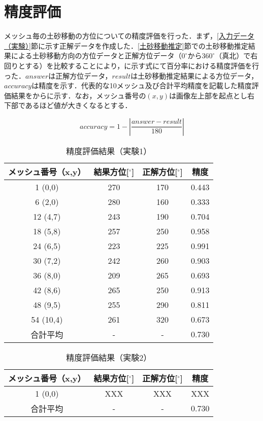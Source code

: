   \section{精度評価}
    メッシュ毎の土砂移動の方位についての精度評価を行った．まず，\ref{入力データ（実験）}節に示す正解データを作成した．\ref{土砂移動推定}節での土砂移動推定結果による土砂移動方向の方位データと正解方位データ（$0^\circ$から$360^\circ$（真北）で右回りとする）を比較することにより，に示す式にて百分率における精度評価を行った．$answer$は正解方位データ，$result$は土砂移動推定結果による方位データ，$accuracy$は精度を示す．代表的な10メッシュ及び合計平均精度を記載した精度評価結果をからに示す．なお，メッシュ番号の$(x,y)$は画像左上部を起点とし右下部であるほど値が大きくなるとする．

    \begin{equation}
      \label{精度評価}
      accuracy = 1 - |\dfrac{answer - result} {180}|
    \end{equation}

    \begin{table}[tbp]
      \centering
      \caption{精度評価結果（実験1）}
      \label{精度評価結果（実験1）}
      \begin{tabular}{cccc}
        \hline
        \textbf{メッシュ番号（x,y）} & \textbf{結果方位[$^{\circ}$]} & \textbf{正解方位[$^{\circ}$]} & \textbf{精度} \\
        \hline  \hline
        1  (0,0)  & 270 & 170 & 0.443 \\
        6  (2,0)  & 280 & 160 & 0.333 \\
        12 (4,7)  & 243 & 190 & 0.704 \\
        18 (5,8)  & 257 & 250 & 0.958 \\
        24 (6,5)  & 223 & 225 & 0.991 \\
        30 (7,2)  & 242 & 260 & 0.903 \\
        36 (8,0)  & 209 & 265 & 0.693 \\
        42 (8,6)  & 265 & 250 & 0.913 \\
        48 (9,5)  & 255 & 290 & 0.811 \\
        54 (10,4) & 261 & 320 & 0.673 \\
        合計平均 & - & - & 0.730 \\
        \hline
      \end{tabular}
    \end{table}

    \begin{table}[tbp]
      \centering
      \caption{精度評価結果（実験2）}
      \begin{tabular}{cccc}
        \hline
        \textbf{メッシュ番号（x,y）} & \textbf{結果方位[$^{\circ}$]} & \textbf{正解方位[$^{\circ}$]} & \textbf{精度} \\
        \hline  \hline
        1  (0,0)  & XXX & XXX & XXX \\
        合計平均 & - & - & 0.730 \\
        \hline
      \end{tabular}
    \end{table}

